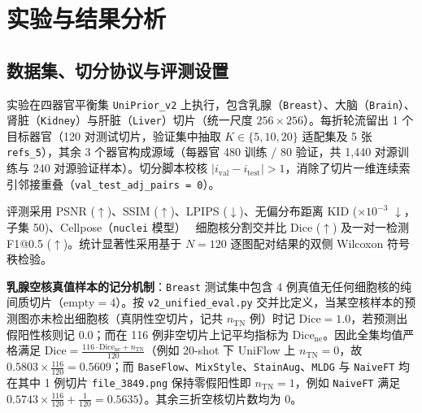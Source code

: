 \documentclass[journal]{IEEEtran}
\newcommand{\methodname}{UniFlow}
\begin{document}
\section{实验与结果分析}
\subsection{数据集、切分协议与评测设置}\label{sec:setup}
实验在四器官平衡集 \texttt{UniPrior\_v2} 上执行，包含乳腺（\texttt{Breast}）、大脑（\texttt{Brain}）、肾脏（\texttt{Kidney}）与肝脏（\texttt{Liver}）切片（统一尺度 $256\times 256$）。每折轮流留出 1 个目标器官（120 对测试切片，验证集中抽取 $K \in \{5, 10, 20\}$ 适配集及 5 张 \texttt{refs\_5}），其余 3 个器官构成源域（每器官 480 训练 / 80 验证，共 1,440 对源训练与 240 对源验证样本）。切分脚本校核 $|i_{\text{val}} - i_{\text{test}}| > 1$，消除了切片一维连续索引邻接重叠（\texttt{val\_test\_adj\_pairs = 0}）。

评测采用 PSNR ($\uparrow$)、SSIM ($\uparrow$)、LPIPS ($\downarrow$)、无偏分布距离 KID ($\times 10^{-3}$ $\downarrow$，子集 50)、Cellpose（\texttt{nuclei} 模型）~\cite{ref_cellpose} 细胞核分割交并比 Dice ($\uparrow$) 及一对一检测 F1@0.5 ($\uparrow$)。统计显著性采用基于 $N=120$ 逐图配对结果的双侧 Wilcoxon 符号秩检验。

\noindent\textbf{乳腺空核真值样本的记分机制}：\texttt{Breast} 测试集中包含 4 例真值无任何细胞核的纯间质切片（$\text{empty}=4$）。按 \texttt{v2\_unified\_eval.py} 交并比定义，当某空核样本的预测图亦未检出细胞核（真阴性空切片，记共 $n_{\text{TN}}$ 例）时记 $\text{Dice}=1.0$，若预测出假阳性核则记 $0.0$；而在 116 例非空切片上记平均指标为 $\text{Dice}_{\text{ne}}$。因此全集均值严格满足 $\text{Dice} = \frac{116\cdot\text{Dice}_{\text{ne}} + n_{\text{TN}}}{120}$（例如 20-shot 下 \methodname{} 上 $n_{\text{TN}}=0$，故 $0.5803\times\frac{116}{120}=0.5609$；而 \texttt{BaseFlow}、\texttt{MixStyle}、\texttt{StainAug}、\texttt{MLDG} 与 \texttt{NaiveFT} 均在其中 1 例切片 \texttt{file\_3849.png} 保持零假阳性即 $n_{\text{TN}}=1$，例如 \texttt{NaiveFT} 满足 $0.5743\times\frac{116}{120}+\frac{1}{120}=0.5635$）。其余三折空核切片数均为 0。
\end{document}
